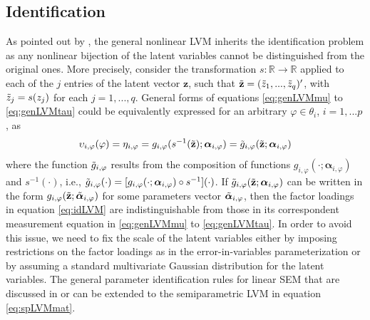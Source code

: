 \documentclass[11pt, a4paper]{article}
\newcommand{\R}{{\ensuremath{\mathbb{R}}}}
\begin{document}
\subsection{Identification}

As pointed out by \citet{Yalcin&Amemiya_StatSci2001}, the general nonlinear LVM inherits the identification problem as any nonlinear bijection of the latent variables cannot be distinguished from the original ones. More precisely, consider the transformation $s:\R \to \R$ applied to each of the $j$ entries of the latent vector $\mathbf{z}$, such that $\Tilde{\mathbf{z}} = (\Tilde{z}_1,...,\Tilde{z}_q)'$, with $\Tilde{z}_j = s(z_j)$ for each $j=1,...,q$. General forms of equations \eqref{eq:genLVMmu} to \eqref{eq:genLVMtau} could be equivalently expressed for an arbitrary $\varphi \in \theta_i$, $i= 1,...p$, as
\begin{equation}
\upsilon_{i,\varphi}(\varphi) = \eta_{i,\varphi} = g_{i,\varphi}(s^{-1}(\Tilde{\mathbf{z}}); \bm{\alpha}_{i,\varphi}) = \Tilde{g}_{i,\varphi}(\Tilde{\mathbf{z}}; \bm{\alpha}_{i,\varphi}) \label{eq:idLVM}
\end{equation}
where the function $\Tilde{g}_{i,\varphi}$ results from the composition of functions  $g_{i,\varphi}(\cdot; \bm{\alpha}_{i,\varphi})$ and $s^{-1}(\cdot)$, i.e., $\Tilde{g}_{i,\varphi}(\cdot) = [g_{i,\varphi}(\cdot; \bm{\alpha}_{i,\varphi}) \circ s^{-1}](\cdot)$. If $\Tilde{g}_{i,\varphi}(\Tilde{\mathbf{z}}; \bm{\alpha}_{i,\varphi})$ can be written in the form $g_{i,\varphi}(\Tilde{\mathbf{z}}; \Tilde{\bm{\alpha}}_{i,\varphi})$ for some parameters vector $\Tilde{\bm{\alpha}}_{i,\varphi}$, then the factor loadings in equation \eqref{eq:idLVM} are indistinguishable from those in its correspondent measurement equation in \eqref{eq:genLVMmu} to \eqref{eq:genLVMtau}. In order to avoid this issue, we need to fix the scale of the latent variables either by imposing restrictions on the factor loadings as in the error-in-variables parameterization or by assuming a  standard multivariate Gaussian distribution for the latent variables. The general parameter identification rules for linear SEM that are discussed in \citet{Joreskog_Psychometrika1969, Anderson&Amemiya_AnnStat1988} or \citet{OBrien_SocMeth1994} can be extended to the semiparametric LVM in equation \eqref{eq:spLVMmat}.
\end{document}
